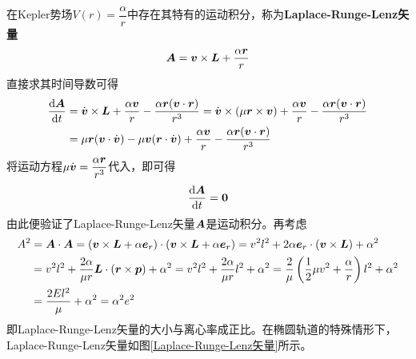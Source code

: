 在Kepler势场$V(r) = \dfrac{\alpha}{r}$中存在其特有的运动积分，称为{\bf Laplace-Runge-Lenz矢量}
\begin{equation}
	\boldsymbol{A} = \boldsymbol{v} \times \boldsymbol{L} + \frac{\alpha \boldsymbol{r}}{r}
\end{equation}
直接求其时间导数可得
\begin{align*}
	\frac{\mathrm{d}\boldsymbol{A}}{\mathrm{d}t} & = \dot{\boldsymbol{v}} \times \boldsymbol{L} + \frac{\alpha \boldsymbol{v}}{r} - \frac{\alpha \boldsymbol{r}(\boldsymbol{v}\cdot \boldsymbol{r})}{r^3} = \dot{\boldsymbol{v}} \times (\mu \boldsymbol{r} \times \boldsymbol{v}) + \frac{\alpha \boldsymbol{v}}{r} - \frac{\alpha \boldsymbol{r}(\boldsymbol{v}\cdot \boldsymbol{r})}{r^3} \\
	& = \mu\boldsymbol{r}(\boldsymbol{v}\cdot\dot{\boldsymbol{v}}) - \mu\boldsymbol{v}(\boldsymbol{r}\cdot \dot{\boldsymbol{v}}) + \frac{\alpha \boldsymbol{v}}{r} - \frac{\alpha \boldsymbol{r}(\boldsymbol{v}\cdot \boldsymbol{r})}{r^3}
\end{align*}
将运动方程$\mu \dot{\boldsymbol{v}} = \dfrac{\alpha\boldsymbol{r}}{r^3}$代入，即可得
\begin{equation*}
	\frac{\mathrm{d}\boldsymbol{A}}{\mathrm{d}t} = \boldsymbol{0}
\end{equation*}
由此便验证了Laplace-Runge-Lenz矢量$\boldsymbol{A}$是运动积分。再考虑
\begin{align*}
	A^2 & = \boldsymbol{A} \cdot \boldsymbol{A} = \left(\boldsymbol{v} \times \boldsymbol{L} + \alpha \boldsymbol{e}_r\right) \cdot \left(\boldsymbol{v} \times \boldsymbol{L} + \alpha \boldsymbol{e}_r\right) = v^2 l^2 + 2\alpha \boldsymbol{e}_r \cdot (\boldsymbol{v} \times \boldsymbol{L}) + \alpha^2 \\
	& = v^2 l^2 + \frac{2\alpha}{\mu r} \boldsymbol{L} \cdot (\boldsymbol{r} \times \boldsymbol{p}) + \alpha^2 = v^2 l^2 + \frac{2\alpha}{\mu r} l^2 + \alpha^2 = \frac{2}{\mu}\left(\frac12\mu v^2 + \frac{\alpha}{r}\right) l^2 + \alpha^2 \\
	& = \frac{2El^2}{\mu} + \alpha^2 = \alpha^2 e^2
\end{align*}
即Laplace-Runge-Lenz矢量的大小与离心率成正比。在椭圆轨道的特殊情形下，Laplace-Runge-Lenz矢量如图\ref{Laplace-Runge-Lenz矢量}所示。


